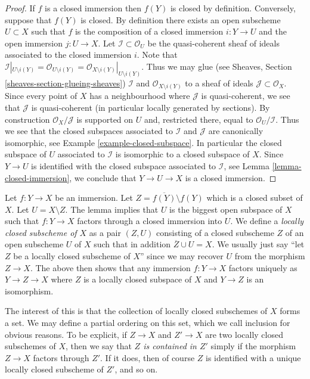 \begin{proof}
If $f$ is a closed immersion then $f(Y)$ is closed by definition.
Conversely, suppose that $f(Y)$ is closed. By definition
there exists an open subscheme $U \subset X$ such that $f$ is the composition
of a closed immersion $i : Y \to U$ and the open immersion
$j : U \to X$. Let $\mathcal{I} \subset \mathcal{O}_U$ be the
quasi-coherent sheaf of ideals associated to the closed immersion
$i$. Note that
$\mathcal{I}|_{U \setminus i(Y)}
= \mathcal{O}_{U \setminus i(Y)}
= \mathcal{O}_{X \setminus i(Y)}|_{U \setminus i(Y)}$.
Thus we may glue (see Sheaves, Section \ref{sheaves-section-glueing-sheaves})
$\mathcal{I}$ and $\mathcal{O}_{X \setminus i(Y)}$ to a sheaf of
ideals $\mathcal{J} \subset \mathcal{O}_X$. Since every
point of $X$ has a neighbourhood where $\mathcal{J}$ is
quasi-coherent, we see that $\mathcal{J}$ is quasi-coherent
(in particular locally generated by sections).
By construction $\mathcal{O}_X/\mathcal{J}$ is supported
on $U$ and, restricted there, equal to $\mathcal{O}_U/\mathcal{I}$.
Thus we see that the closed subspaces associated to $\mathcal{I}$
and $\mathcal{J}$ are canonically isomorphic, see
Example \ref{example-closed-subspace}.
In particular the closed subspace of $U$ associated to $\mathcal{I}$
is isomorphic to a closed subspace of $X$.
Since $Y \to U$ is identified with the closed subspace
associated to $\mathcal{I}$, see Lemma \ref{lemma-closed-immersion},
we conclude that $Y \to U \to X$
is a closed immersion.
\end{proof}

\noindent
Let $f : Y \to X$ be an immersion.
Let $Z = \overline{f(Y)} \setminus f(Y)$ which is a closed subset of $X$.
Let $U = X \setminus Z$.
The lemma implies that $U$ is the biggest open subspace of $X$
such that $f : Y \to X$ factors through a closed immersion into $U$.
We define a {\it locally closed subscheme of $X$} as a pair
$(Z, U)$ consisting of a closed subscheme $Z$ of an open subscheme $U$
of $X$ such that in addition $\overline{Z} \cup U = X$. We usually
just say ``let $Z$ be a locally closed subscheme of $X$'' since we may
recover $U$ from the morphism $Z \to X$. The above
then shows that any immersion $f : Y \to X$ factors uniquely
as $Y \to Z \to X$ where $Z$ is a locally closed subspace of $X$
and $Y \to Z$ is an isomorphism.

\medskip\noindent
The interest of this is that the collection of locally closed subschemes
of $X$ forms a set. We may define a partial ordering on this set,
which we call inclusion for obvious reasons. To be explicit, if
$Z \to X$ and $Z' \to X$ are two locally closed subschemes of $X$, then
we say that {\it $Z$ is contained in $Z'$} simply if the morphism
$Z \to X$ factors through $Z'$. If it does, then of course $Z$ is identified
with a unique locally closed subscheme of $Z'$, and so on.

